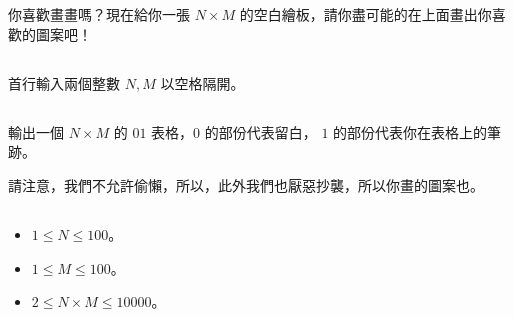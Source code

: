 


\section*{}
\subsection*{}
你喜歡畫畫嗎？現在給你一張 $N\times M$ 的空白繪板，請你盡可能的在上面畫出你喜歡的圖案吧！
\subsection*{}
首行輸入兩個整數 $N,M$ 以空格隔開。
\subsection*{}
輸出一個 $N \times M$ 的 $01$ 表格，$0$ 的部份代表留白， $1$ 的部份代表你在表格上的筆跡。

請注意，我們不允許偷懶，所以，此外我們也厭惡抄襲，所以你畫的圖案也。
\subsection*{}
\begin{itemize}
    \item $1\le N\le 100$。
    \item $1\le M\le 100$。
    \item $2\le N\times M\le 10000$。
\end{itemize}
\subsection*{}
{
\setlength\parindent{0pt}
}
\subsection*{}
{
\setlength\parindent{0pt}
}
\subsection*{}
{
\setlength\parindent{0pt}
}
\subsection*{}
{
\setlength\parindent{0pt}
}
